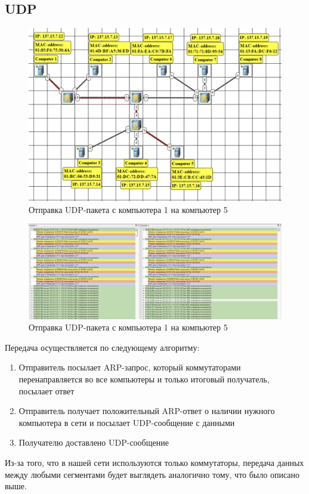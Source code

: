 \documentclass[12pt,onecolumn]{article}
\begin{document}
\subsection{UDP}
\begin{figure}[H]
  \centering
  \includegraphics[width=\textwidth]{image/part3/udp-0.png}
  \caption{Отправка UDP-пакета с компьютера 1 на компьютер 5}
\end{figure}
\begin{figure}[H]
  \centering
  \includegraphics[width=\textwidth]{image/part3/udp-1.png}
  \caption{Отправка UDP-пакета с компьютера 1 на компьютер 5}
\end{figure}

Передача осуществляется по следующему алгоритму:
\begin{enumerate}
  \item Отправитель посылает ARP-запрос, который коммутаторами перенаправляется во все компьютеры и только итоговый получатель, посылает ответ
  \item Отправитель получает положительный ARP-ответ о наличии нужного компьютера в сети и посылает UDP-сообщение с данными
  \item Получателю доставлено UDP-сообщение
\end{enumerate}
Из-за того, что в нашей сети используются только коммутаторы, передача данных между любыми сегментами будет выглядеть аналогично тому, что было описано выше.
\end{document}
